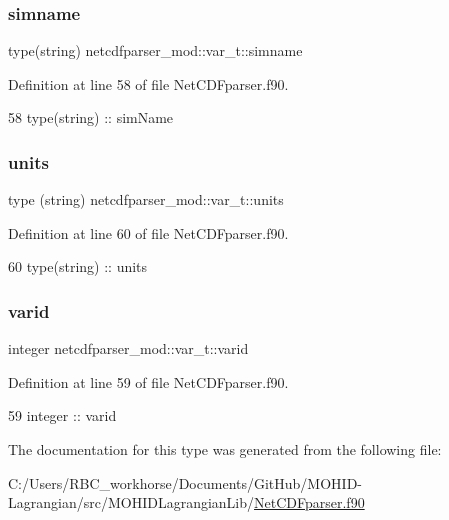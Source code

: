 \subsubsection{\texorpdfstring{simname}{simname}}
{\footnotesize\ttfamily type(string) netcdfparser\+\_\+mod\+::var\+\_\+t\+::simname\hspace{0.3cm}{\ttfamily [private]}}



Definition at line 58 of file Net\+C\+D\+Fparser.\+f90.


\begin{DoxyCode}
58         \textcolor{keywordtype}{type}(string) :: simName
\end{DoxyCode}
\mbox{\label{structnetcdfparser__mod_1_1var__t_ac7b0d52ef17496213c66b5a34dc8f8b6}} 
\subsubsection{\texorpdfstring{units}{units}}
{\footnotesize\ttfamily type (string) netcdfparser\+\_\+mod\+::var\+\_\+t\+::units\hspace{0.3cm}{\ttfamily [private]}}



Definition at line 60 of file Net\+C\+D\+Fparser.\+f90.


\begin{DoxyCode}
60         type(string) :: units
\end{DoxyCode}
\mbox{\label{structnetcdfparser__mod_1_1var__t_af3b333b148f6159bade3f9263c03892e}} 
\subsubsection{\texorpdfstring{varid}{varid}}
{\footnotesize\ttfamily integer netcdfparser\+\_\+mod\+::var\+\_\+t\+::varid\hspace{0.3cm}{\ttfamily [private]}}



Definition at line 59 of file Net\+C\+D\+Fparser.\+f90.


\begin{DoxyCode}
59         \textcolor{keywordtype}{integer} :: varid
\end{DoxyCode}


The documentation for this type was generated from the following file\+:\begin{DoxyCompactItemize}
\item 
C\+:/\+Users/\+R\+B\+C\+\_\+workhorse/\+Documents/\+Git\+Hub/\+M\+O\+H\+I\+D-\/\+Lagrangian/src/\+M\+O\+H\+I\+D\+Lagrangian\+Lib/\mbox{\hyperlink{_net_c_d_fparser_8f90}{Net\+C\+D\+Fparser.\+f90}}\end{DoxyCompactItemize}

